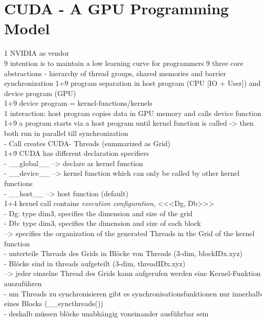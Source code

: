 \documentclass[a4paper,12pt]{llncs}
\numberwithin{equation}{section}
\begin{document}
\section{CUDA - A GPU Programming Model}
      1 NVIDIA as vendor\\
      9 intention is to maintain a low learning curve for programmers
      9 three core abstractions - hierarchy of thread groups, shared memories and barrier synchronization
      1+9 program separation in host program (CPU [IO + User]) and device program (GPU)\\
      1+9 device program = kernel-functions/kernels\\
	  1 interaction: host program copies data in GPU memory and calls device function\\
	  1+9 a program starts via a host program until kernel function is called -> then both run in parallel till synchronization\\
		- Call creates CUDA- Threads (summarized as Grid)\\
	  1+9 CUDA has different declaration specifiers\\
        - __global__ --> declare as kernel function\\
        - __device__ --> kernel function which can only be called by other kernel functions\\
        - __host__ --> host function (default)\\
	  1+4 kernel call contains \textit{execution configuration}, <<<Dg, Db>>>\\
   	    - Dg: type dim3, specifies the dimension and size of the grid\\
   	    - Db: type dim3, specifies the dimension and size of each block\\
	    --> specifies the organization of the generated Threads in the Grid of the kernel function\\
	  	  - unterteile Threads des Grids in Blöcke von Threads (3-dim, blockIDx.xyz)\\
	  	  - Blöcke sind in threads aufgeteilt (3-dim, threadIDx.xyz)\\
	   --> jeder einzelne Thread des Grids kann aufgerufen werden eine Kernel-Funktion auszuführen\\
          - um Threads zu synchronisieren gibt es synchronisationsfunktionen nur innerhalb eines Blocks (__syncthreads())\\
          - deshalb müssen blöcke unabhängig voneinander ausführbar sein\\
  
\end{document}
